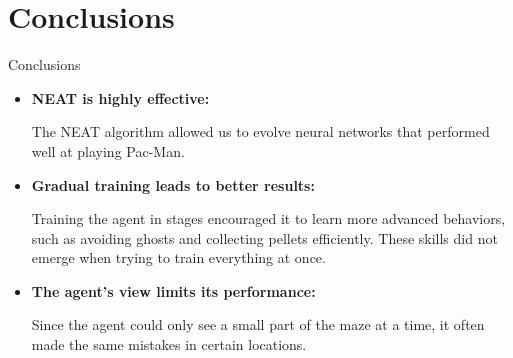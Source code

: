 \section{Conclusions}

\begin{frame}{Conclusions}
	\begin{itemize}
		\item \textbf{NEAT is highly effective:} 
		
		The NEAT algorithm allowed us to evolve neural networks that performed well at playing Pac-Man.
		\vspace{1em}
		\item \textbf{Gradual training leads to better results:}
		
		Training the agent in stages encouraged it to learn more advanced behaviors, such as avoiding ghosts and collecting pellets efficiently. These skills did not emerge when trying to train everything at once.
		\vspace{1em}
		\item \textbf{The agent's view limits its performance:} 
		
		Since the agent could only see a small part of the maze at a time, it often made the same mistakes in certain locations.
	\end{itemize}
\end{frame}

